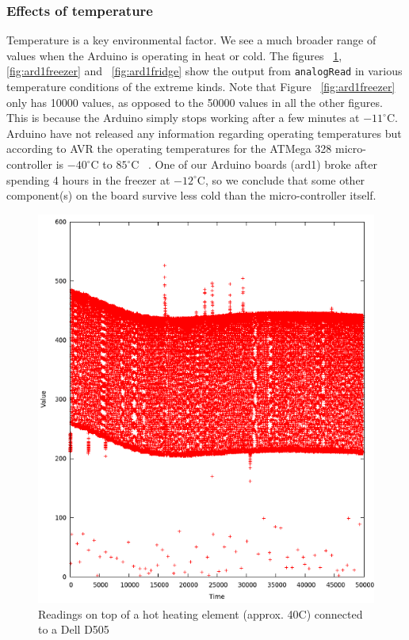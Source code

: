 \documentclass[a4paper]{article}           %
\begin{document}
\FloatBarrier
\subsubsection{Effects of temperature}
\FloatBarrier

Temperature is a key environmental factor. We see a much broader range of values when the Arduino is operating in heat or cold. The figures ~\ref{fig:ard1heat}, \ref{fig:ard1freezer} and ~\ref{fig:ard1fridge} show the output from \texttt{analogRead} in various temperature conditions of the extreme kinds. Note that Figure ~\ref{fig:ard1freezer} only has 10000 values, as opposed to the 50000 values in all the other figures. This is because the Arduino simply stops working after a few minutes at $-11^\circ$C. Arduino have not released any information regarding operating temperatures but according to AVR the operating temperatures for the ATMega 328 micro-controller is $-40^\circ$C to $85^\circ$C  ~\cite{atmegads}. One of our Arduino boards (ard1) broke after spending 4 hours in the freezer at $-12^\circ$C, so we conclude that some other component(s) on the board survive less cold than the micro-controller itself. 



\begin{figure}[h!]
  \centering  
  \includegraphics[width=0.6\columnwidth]{img/heating.png}
  \caption{Readings on top of a hot heating element (approx. 40C) connected to a Dell D505}
  \label{fig:ard1heat}
\end{figure}

  
\end{document}
